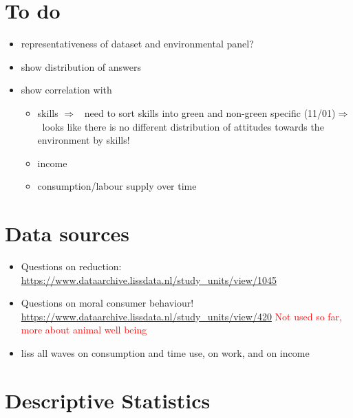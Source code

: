 \documentclass[12pt]{article}
\newcommand{\ar}{$\Rightarrow$ \ }
\newcommand{\tr}[1]{\textcolor{red}{#1}}
\begin{document}
\section{To do}
\begin{itemize}
	\item representativeness of dataset and environmental panel?
	\item show distribution of answers \checkmark
	\item show correlation with 
	\begin{itemize}
		\item skills \ar need to sort skills into green and non-green specific (11/01)\ar looks like there is no different distribution of attitudes towards the environment by skills! \checkmark
		\item income
		\item consumption/labour supply over time \checkmark
	\end{itemize}
\end{itemize}

\section{Data sources}
\begin{itemize}
\item 
Questions on reduction:
\url{https://www.dataarchive.lissdata.nl/study_units/view/1045}
\item Questions on moral consumer behaviour! 
\url{https://www.dataarchive.lissdata.nl/study_units/view/420} \tr{Not used so far, more about animal well being}
\item liss all waves on consumption and time use, on work, and on income
\end{itemize}


\section{Descriptive Statistics}
\end{document}
